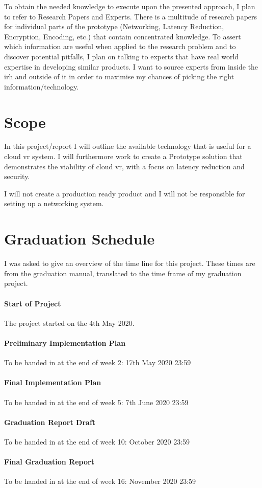 \documentclass[]{article}
\begin{document}
To obtain the needed knowledge to execute upon the presented approach, I plan to refer to Research Papers and Experts. There is a multitude of research papers for individual parts of the prototype (Networking, Latency Reduction, Encryption, Encoding, etc.) that contain concentrated knowledge. To assert which information are useful when applied to the research problem and to discover potential pitfalls, I plan on talking to experts that have real world expertise in developing similar products. I want to source experts from inside the \acrfull{irh} and outside of it in order to maximise my chances of picking the right information/technology. 

\section{Scope}
In this project/report I will outline the available technology that is useful for a cloud \acrshort{vr} system. I will furthermore work to create a Prototype solution that demonstrates the viability of cloud \acrshort{vr}, with a focus on latency reduction and security.

I will not create a production ready product and I will not be responsible for setting up a networking system.

\newpage
\section{Graduation Schedule}
I was asked to give an overview of the time line for this project. These times are from the graduation manual, translated to the time frame of my graduation project. 
\paragraph{Start of Project}
The project started on the 4th May 2020.
\paragraph{Preliminary Implementation Plan}
To be handed in at the end of week 2: 17th May 2020 23:59
\paragraph{Final Implementation Plan}
To be handed in at the end of week 5: 7th June 2020 23:59
\paragraph{Graduation Report Draft}
To be handed in at the end of week 10: October 2020 23:59
\paragraph{Final Graduation Report}
To be handed in at the end of week 16: November 2020 23:59

\newpage
\printbibliography
\end{document}
